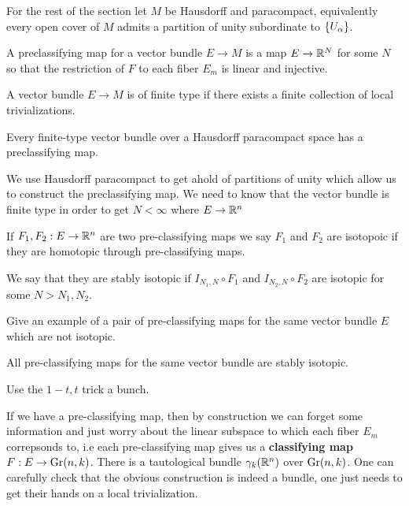 \documentclass[12pt]{article}
\begin{document}
For the rest of the section let $M$ be Hausdorff and paracompact, equivalently  every open cover of $M$ admits a partition of unity subordinate to $\{U_\alpha\}$.

\begin{definition}
    A preclassifying map for a vector bundle $E\to M$ is a map $E\to \mathbb{R}^N$ for some $N$ so that the restriction of $F$ to each fiber $E_m$ is linear and injective.
\end{definition}

\begin{definition}
    A vector bundle $E\to M$ is of finite type if there exists a finite collection of local trivializations.
\end{definition}

\begin{proposition}
    Every finite-type vector bundle over a Hausdorff paracompact space has a preclassifying map.
\end{proposition}
\begin{remark}
    We use Hausdorff paracompact to get ahold of partitions of unity which allow us to construct the preclassifying map. We need to know that the vector bundle is finite type in order to get $N < \infty$ where $E\to \mathbb{R}^n$
\end{remark}

\begin{definition}
    If $F_1,F_2:E\to\mathbb{R}^n$ are two pre-classifying maps we say $F_1$ and $F_2$ are isotopoic if they are homotopic through pre-classifying maps.

    \hfill

        We say that they are stably isotopic if $I_{N_1,N}\circ F_1$ and $I_{N_2,N}\circ F_2$ are isotopic for some $N > N_1,N_2$.
\end{definition}
\begin{example}
    Give an example of a pair of pre-classifying maps for the same vector bundle $E$ which are not isotopic.
\end{example}
\begin{theorem}
    All pre-classifying maps for the same vector bundle are stably isotopic.
\end{theorem}
\begin{remark}
    Use the $1-t,t$ trick a bunch.
\end{remark}
If we have a pre-classifying map, then by construction we can forget some information and just worry about the linear subspace to which each fiber $E_m$ correpsonds to, i.e each pre-classifying map gives us a \textbf{classifying map} $F:E\to\operatorname{Gr}(n,k)$. There is a tautological bundle $\gamma_k(\mathbb{R}^n)$ over $\operatorname{Gr}(n,k)$. One can carefully check that the obvious construction is indeed a bundle, one just needs to get their hands on a local trivialization.
\end{document}
